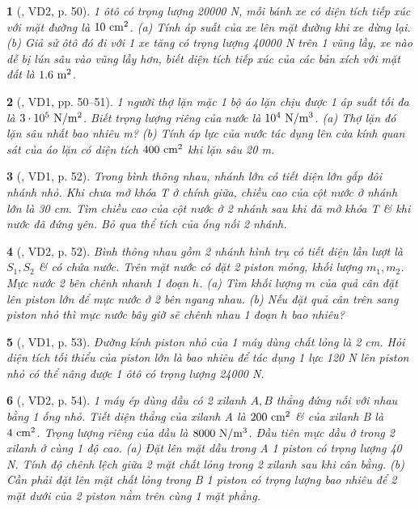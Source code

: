 \documentclass{article}
\newtheorem{baitoan}{}
\begin{document}
\begin{baitoan}[\cite{Van_Quyen_Hanh_Nhu_10_chuyen_Ly}, VD2, p. 50]
	1 ôtô có trọng lượng {\rm20000 N}, mỗi bánh xe có diện tích tiếp xúc với mặt đường là $\rm10\ cm^2$. (a) Tính áp suất của xe lên mặt đường khi xe dừng lại. (b) Giả sử ôtô đó đi với 1 xe tăng có trọng lượng {\rm40000 N} trên 1 vũng lầy, xe nào dễ bị lún sâu vào vũng lầy hơn, biết diện tích tiếp xúc của các bản xích với mặt đất là $\rm1.6\ m^2$.
\end{baitoan}

\begin{baitoan}[\cite{Van_Quyen_Hanh_Nhu_10_chuyen_Ly}, VD1, pp. 50--51]
	1 người thợ lặn mặc 1 bộ áo lặn chịu được 1 áp suất tối đa là $\rm3\cdot10^5\ N{\tt/}m^2$. Biết trọng lượng riêng của nước là $\rm10^4\ N{\tt/}m^3$. (a) Thợ lặn đó lặn sâu nhất bao nhiêu {\rm m}? (b) Tính áp lực của nước tác dụng lên cửa kính quan sát của áo lặn có diện tích $\rm400\ cm^2$ khi lặn sâu {\rm20 m}.
\end{baitoan}

\begin{baitoan}[\cite{Van_Quyen_Hanh_Nhu_10_chuyen_Ly}, VD1, p. 52]
	Trong bình thông nhau, nhánh lớn có tiết diện lớn gấp đôi nhánh nhỏ. Khi chưa mở khóa T ở chính giữa, chiều cao của cột nước ở nhánh lớn là {\rm30 cm}. Tìm chiều cao của cột nước ở 2 nhánh sau khi đã mở khóa T \& khi nước đã đứng yên. Bỏ qua thể tích của ống nối 2 nhánh.
\end{baitoan}

\begin{baitoan}[\cite{Van_Quyen_Hanh_Nhu_10_chuyen_Ly}, VD2, p. 52]
	Bình thông nhau gồm 2 nhánh hình trụ có tiết diện lần lượt là $S_1,S_2$ \& có chứa nước. Trên mặt nước có đặt 2 piston mỏng, khối lượng $m_1,m_2$. Mực nước 2 bên chênh nhanh 1 đoạn $h$. (a) Tìm khối lượng $m$ của quả cân đặt lên piston lớn để mực nước ở 2 bên ngang nhau. (b) Nếu đặt quả cân trên sang piston nhỏ thì mực nước bây giờ sẽ chênh nhau 1 đoạn $h$ bao nhiêu?
\end{baitoan}

\begin{baitoan}[\cite{Van_Quyen_Hanh_Nhu_10_chuyen_Ly}, VD1, p. 53]
	Đường kính piston nhỏ của 1 máy dùng chất lỏng là {\rm2 cm}. Hỏi diện tích tối thiểu của piston lớn là bao nhiêu để tác dụng 1 lực {\rm120 N} lên piston nhỏ có thể nâng được 1 ôtô có trọng lượng {\rm24000 N}.
\end{baitoan}

\begin{baitoan}[\cite{Van_Quyen_Hanh_Nhu_10_chuyen_Ly}, VD2, p. 54]
	1 máy ép dùng dầu có 2 xilanh $A,B$ thẳng đứng nối với nhau bằng 1 ống nhỏ. Tiết diện thẳng của xilanh A là $\rm200\ cm^2$ \& của xilanh B là $\rm4\ cm^2$. Trọng lượng riêng của dầu là $\rm8000\ N{\tt/}m^3$. Đầu tiên mực dầu ở trong 2 xilanh ở cùng 1 độ cao. (a) Đặt lên mặt dầu trong A 1 piston có trọng lượng {\rm40 N}. Tính độ chênh lệch giữa 2 mặt chất lỏng trong 2 xilanh sau khi cân bằng. (b) Cần phải đặt lên mặt chất lỏng trong B 1 piston có trọng lượng bao nhiêu để 2 mặt dưới của 2 piston nằm trên cùng 1 mặt phẳng.
\end{baitoan}
\end{document}

